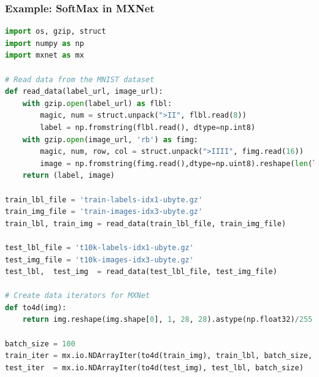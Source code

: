 \begin{frame}[fragile]
  \MyLogo
  \frametitle{Example: SoftMax in MXNet}  

\begin{lstlisting}[language=python]
import os, gzip, struct
import numpy as np
import mxnet as mx

# Read data from the MNIST dataset
def read_data(label_url, image_url):
    with gzip.open(label_url) as flbl:
        magic, num = struct.unpack(">II", flbl.read(8))
        label = np.fromstring(flbl.read(), dtype=np.int8)
    with gzip.open(image_url, 'rb') as fimg:
        magic, num, row, col = struct.unpack(">IIII", fimg.read(16))
        image = np.fromstring(fimg.read(),dtype=np.uint8).reshape(len(label),row,col)
    return (label, image)

train_lbl_file = 'train-labels-idx1-ubyte.gz'
train_img_file = 'train-images-idx3-ubyte.gz'
train_lbl, train_img = read_data(train_lbl_file, train_img_file)

test_lbl_file = 't10k-labels-idx1-ubyte.gz'
test_img_file = 't10k-images-idx3-ubyte.gz'
test_lbl,  test_img  = read_data(test_lbl_file, test_img_file)

# Create data iterators for MXNet
def to4d(img):
    return img.reshape(img.shape[0], 1, 28, 28).astype(np.float32)/255

batch_size = 100
train_iter = mx.io.NDArrayIter(to4d(train_img), train_lbl, batch_size, shuffle=True)
test_iter  = mx.io.NDArrayIter(to4d(test_img), test_lbl, batch_size)

\end{lstlisting}

\end{frame}


